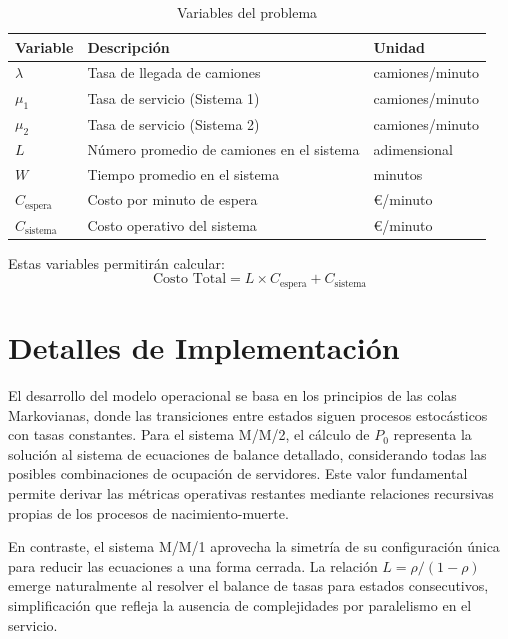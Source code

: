 \documentclass[12pt, a4paper]{article}
\begin{document}
	\begin{table}[h]
		\centering
		\caption{Variables del problema}
		\begin{tabular}{|l|l|l|}
			\hline
			\textbf{Variable} & \textbf{Descripción} & \textbf{Unidad} \\ \hline
			$\lambda$ & Tasa de llegada de camiones & camiones/minuto \\ \hline
			$\mu_1$ & Tasa de servicio (Sistema 1) & camiones/minuto \\ \hline
			$\mu_2$ & Tasa de servicio (Sistema 2) & camiones/minuto \\ \hline
			$L$ & Número promedio de camiones en el sistema & adimensional \\ \hline
			$W$ & Tiempo promedio en el sistema & minutos \\ \hline
			$C_{\text{espera}}$ & Costo por minuto de espera & €/minuto \\ \hline
			$C_{\text{sistema}}$ & Costo operativo del sistema & €/minuto \\ \hline
		\end{tabular}
	\end{table}
	
	\noindent Estas variables permitirán calcular:
	\begin{equation}
		\text{Costo Total} = L \times C_{\text{espera}} + C_{\text{sistema}}
	\end{equation}
	
    \section{Detalles de Implementación}
    
    El desarrollo del modelo operacional se basa en los principios de las colas Markovianas, donde las transiciones entre estados siguen procesos estocásticos con tasas constantes. Para el sistema M/M/2, el cálculo de $P_0$ representa la solución al sistema de ecuaciones de balance detallado, considerando todas las posibles combinaciones de ocupación de servidores. Este valor fundamental permite derivar las métricas operativas restantes mediante relaciones recursivas propias de los procesos de nacimiento-muerte.
    
    En contraste, el sistema M/M/1 aprovecha la simetría de su configuración única para reducir las ecuaciones a una forma cerrada. La relación $L = \rho/(1-\rho)$ emerge naturalmente al resolver el balance de tasas para estados consecutivos, simplificación que refleja la ausencia de complejidades por paralelismo en el servicio.
    
\end{document}
